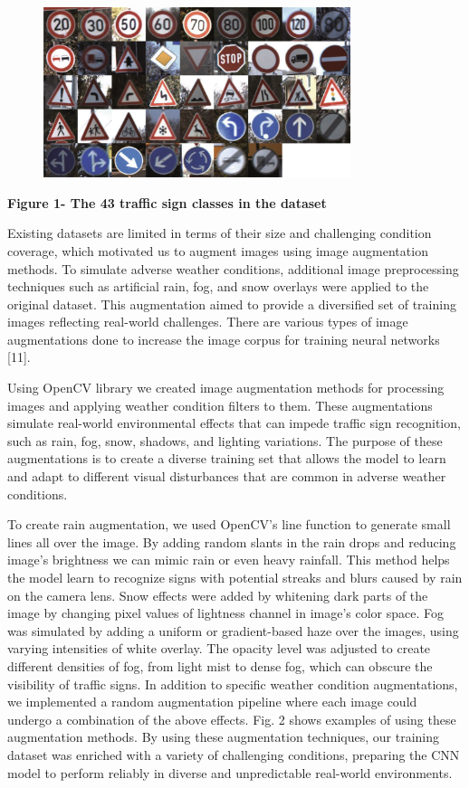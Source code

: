 \begin{figure}[H]
	\centering
	\includegraphics[width=0.8\textwidth]{assets/57}
	\caption*{}
\end{figure}

\textbf{Figure 1- The 43 traffic sign classes in the dataset}

Existing datasets are limited in terms of their size and challenging
condition coverage, which motivated us to augment images using image
augmentation methods. To simulate adverse weather conditions, additional
image preprocessing techniques such as artificial rain, fog, and snow
overlays were applied to the original dataset. This augmentation aimed
to provide a diversified set of training images reflecting real-world
challenges. There are various types of image augmentations done to
increase the image corpus for training neural networks {[}11{]}.

Using OpenCV library we created image augmentation methods for
processing images and applying weather condition filters to them. These
augmentations simulate real-world environmental effects that can impede
traffic sign recognition, such as rain, fog, snow, shadows, and lighting
variations. The purpose of these augmentations is to create a diverse
training set that allows the model to learn and adapt to different
visual disturbances that are common in adverse weather conditions.

To create rain augmentation, we used OpenCV's line function to generate
small lines all over the image. By adding random slants in the rain
drops and reducing image's brightness we can mimic rain or even heavy
rainfall. This method helps the model learn to recognize signs with
potential streaks and blurs caused by rain on the camera lens. Snow
effects were added by whitening dark parts of the image by changing
pixel values of lightness channel in image's color space. Fog was
simulated by adding a uniform or gradient-based haze over the images,
using varying intensities of white overlay. The opacity level was
adjusted to create different densities of fog, from light mist to dense
fog, which can obscure the visibility of traffic signs. In addition to
specific weather condition augmentations, we implemented a random
augmentation pipeline where each image could undergo a combination of
the above effects. Fig. 2 shows examples of using these augmentation
methods. By using these augmentation techniques, our training dataset
was enriched with a variety of challenging conditions, preparing the CNN
model to perform reliably in diverse and unpredictable real-world
environments.

